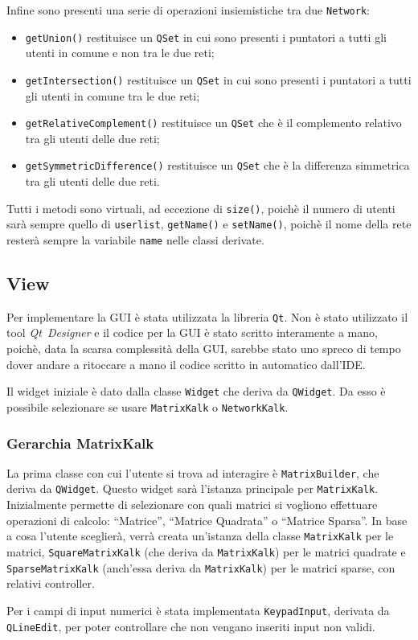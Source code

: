 Infine sono presenti una serie di operazioni insiemistiche tra due \texttt{Network}: 
\begin{itemize}[noitemsep]
    \item \texttt{getUnion()} restituisce un \texttt{QSet} in cui sono presenti i puntatori a tutti gli utenti
    in comune e non tra le due reti;
    \item \texttt{getIntersection()} restituisce un \texttt{QSet} in cui sono presenti i puntatori a tutti gli 
    utenti in comune tra le due reti;
    \item \texttt{getRelativeComplement()} restituisce un \texttt{QSet} che è il complemento relativo tra gli utenti 
    delle due reti;
    \item \texttt{getSymmetricDifference()} restituisce un \texttt{QSet} che è la differenza simmetrica tra gli utenti
    delle due reti.
\end{itemize}

Tutti i metodi sono virtuali, ad eccezione di \texttt{size()}, poichè il numero di utenti sarà sempre quello di 
\texttt{userlist}, \texttt{getName()} e \texttt{setName()}, poichè il nome della rete resterà sempre la variabile
\texttt{name} nelle classi derivate.
 
\subsection{View}

Per implementare la GUI è stata utilizzata la libreria \texttt{Qt}. Non è stato utilizzato il tool \mbox{\emph{Qt Designer}} e il codice per la GUI è stato scritto
interamente a mano, poichè, data la scarsa complessità della GUI, sarebbe stato uno spreco di tempo dover andare a ritoccare a mano
il codice scritto in automatico dall'IDE.\par
Il widget iniziale è dato dalla classe 
\texttt{Widget} che deriva da \texttt{QWidget}. Da esso è possibile selezionare se usare \texttt{MatrixKalk} 
o \texttt{NetworkKalk}.

\subsubsection{Gerarchia MatrixKalk}
La prima classe con cui l'utente si trova ad interagire è \texttt{MatrixBuilder}, che deriva da \texttt{QWidget}.
Questo widget sarà l'istanza principale per \texttt{MatrixKalk}. Inizialmente permette di selezionare con quali 
matrici si vogliono effettuare operazioni di calcolo: ``Matrice'', ``Matrice Quadrata'' o ``Matrice Sparsa''.
In base a cosa l'utente sceglierà, verrà creata un'istanza della classe \texttt{MatrixKalk} per le matrici, 
\texttt{SquareMatrixKalk} (che deriva da \texttt{MatrixKalk}) per le matrici quadrate e \texttt{SparseMatrixKalk} 
(anch'essa deriva da \texttt{MatrixKalk}) per le matrici sparse, con relativi controller.\par
Per i campi di input numerici è stata implementata \texttt{KeypadInput}, derivata da \texttt{QLineEdit}, per poter controllare che non vengano inseriti
input non validi.

